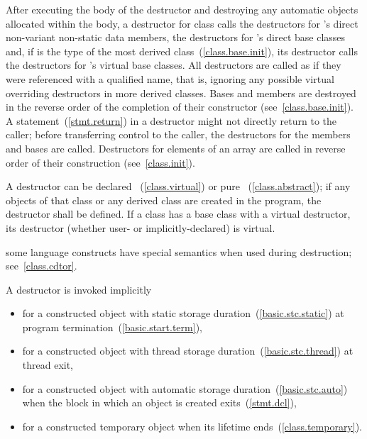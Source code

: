 \pnum
{}%
%
%
After executing the body of the destructor and destroying
any automatic objects allocated within the body, a
destructor for class
calls the destructors for
's
direct non-variant non-static data members, the destructors for
's
direct base classes and, if
is the type of the most derived class~(\ref{class.base.init}),
its destructor calls the destructors for
's
virtual base classes.
All destructors are called as if they were referenced with a qualified name,
that is, ignoring any possible virtual overriding destructors in more
derived classes.
Bases and members are destroyed in the reverse order of the completion of
their constructor (see~\ref{class.base.init}).
A
statement~(\ref{stmt.return}) in a destructor might not directly return to the
caller; before transferring control to the caller, the destructors for the
members and bases are called.
%
Destructors for elements of an array are called in reverse order of their
construction (see~\ref{class.init}).

\pnum
{}%
%
A destructor can be declared
~(\ref{class.virtual})
or pure
~(\ref{class.abstract});
if any objects of that class or any derived class are created in the program,
the destructor shall be defined.
If a class has a base class with a virtual destructor, its  destructor
(whether user- or implicitly-declared) is virtual.

\pnum
\enternote
{}%
some language constructs have special semantics when used during destruction;
see~\ref{class.cdtor}.
\exitnote

\pnum
{}%
%
A destructor is invoked implicitly

\begin{itemize}

\item for a constructed object with static storage duration~(\ref{basic.stc.static}) at program termination~(\ref{basic.start.term}),

\item for a constructed object with thread storage duration~(\ref{basic.stc.thread}) at thread exit,

\item for a constructed object with automatic storage duration~(\ref{basic.stc.auto}) when the block in which an object is created exits~(\ref{stmt.dcl}),

\item for a constructed temporary object when its lifetime ends~(\ref{class.temporary}).
\end{itemize}


